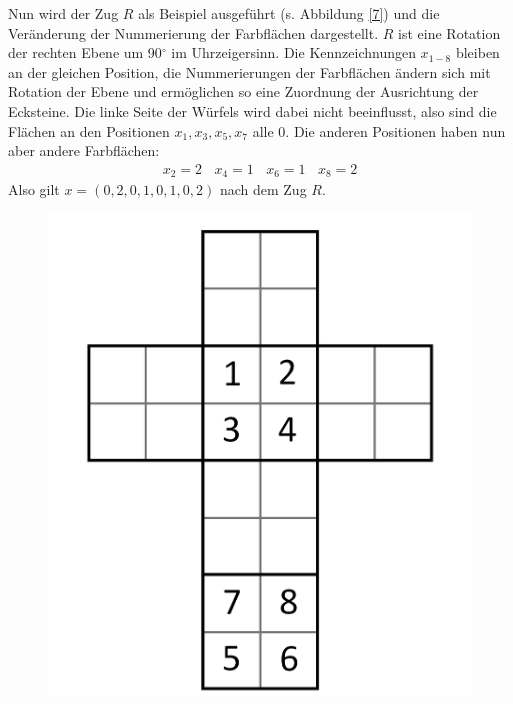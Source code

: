 \documentclass[12pt,a4paper, usenames, dvipsnames]{article}
\begin{document}
Nun wird der Zug $R$ als Beispiel ausgeführt (s. Abbildung \ref{7}) und die Veränderung der Nummerierung der Farbflächen dargestellt. $R$ ist eine Rotation der rechten Ebene um 90$^\circ$ im Uhrzeigersinn. 
Die Kennzeichnungen $x_{1-8}$ bleiben an der gleichen Position, die Nummerierungen  der Farbflächen ändern sich mit Rotation der Ebene und ermöglichen so eine Zuordnung der Ausrichtung der Ecksteine. 
Die linke Seite der Würfels wird dabei nicht beeinflusst, also sind die Flächen an den Positionen $x_1, x_3, x_5, x_7$ alle 0. 
Die anderen Positionen haben nun aber andere Farbflächen: 
\begin{align*}
x_2 = 2 \ \ \ \ x_4 = 1 \ \ \ \ x_6 = 1 \ \ \ \ x_8 = 2  
\end{align*}
Also gilt $x = (0, 2, 0, 1, 0, 1, 0, 2)$ nach dem Zug $R$. 
\begin{figure}[h]
\centering
\includegraphics[scale=0.1]{foldedout_012_white.png}

\end{figure}
\end{document}
